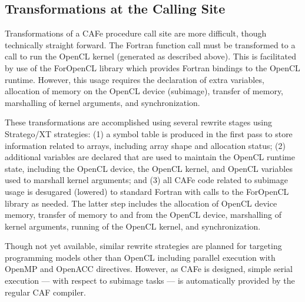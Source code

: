 \subsection{Transformations at the Calling Site}

Transformations of a CAFe procedure call site are more difficult, though technically
straight forward.  The Fortran function call must be transformed to a call to run the
OpenCL kernel (generated as described above).  This is facilitated by use of the ForOpenCL
library which provides Fortran bindings to the OpenCL
runtime\cite{Sottile:2013:FTE:2441516.2441520}.  However, this usage requires the
declaration of extra variables, allocation of memory on the OpenCL device (subimage),
transfer of memory, marshalling of kernel arguments, and synchronization.

These transformations are accomplished using several rewrite stages using Stratego/XT
strategies:
(1) a symbol table is produced in the first pass to store information related to arrays,
including array shape and allocation status;
(2) additional variables are declared that are used to maintain the OpenCL runtime state,
including the OpenCL device, the OpenCL kernel, and OpenCL variables used to marshall
kernel arguments; and
(3) all CAFe code related to subimage usage is desugared (lowered) to standard Fortran
with calls to the ForOpenCL library as needed.
The latter step includes the allocation of OpenCL device memory, transfer of memory to and
from the OpenCL device, marshalling of kernel arguments, running of the OpenCL kernel, and
synchronization.

Though not yet available, similar rewrite strategies are planned for targeting programming
models other than OpenCL including parallel execution with OpenMP and OpenACC directives.
However, as CAFe is designed, simple serial execution --- with respect to subimage tasks
--- is automatically provided by the regular CAF compiler.
